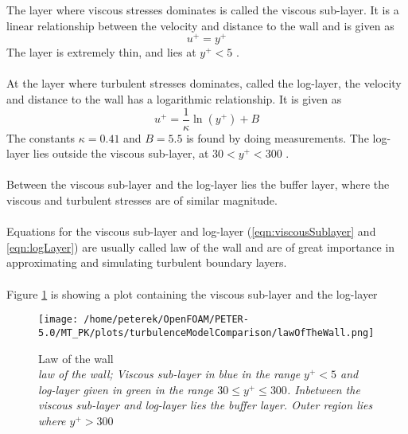 \documentclass[a4paper, 12pt]{report}
\begin{document}
The layer where viscous stresses dominates is called the viscous sub-layer. It is a linear relationship between the velocity and distance to the wall and is given as \cite{CFD}
\begin{equation}
u^+ = y^+
\label{eqn:viscousSublayer}
\end{equation}
The layer is extremely thin, and lies at $y^+ < 5$ \cite{CFD}.\\
\\ 
At the layer where turbulent stresses dominates, called the log-layer, the velocity and distance to the wall has a logarithmic relationship. It is given as \cite{CFD}
\begin{equation}
u^+ = \frac{1}{\kappa}\ln(y^+) + B
\label{eqn:logLayer}
\end{equation}
The constants $\kappa = 0.41$  and $B= 5.5$ is found by doing measurements. The log-layer lies outside the viscous sub-layer, at $30 < y^+ < 300$ \cite{CFD}.\\
\\
Between the viscous sub-layer and the log-layer lies the buffer layer, where the viscous and turbulent stresses are of similar magnitude.\\
\\
Equations for the viscous sub-layer and log-layer (\ref{eqn:viscousSublayer} and  \ref{eqn:logLayer}) are usually called law of the wall and are of great importance in approximating and simulating turbulent boundary layers.\\
\\
Figure \ref{fig:lawOfTheWall} is showing a plot containing the viscous sub-layer and the log-layer
\begin{figure}[H]
	\centering
	\texttt{[image: /home/peterek/OpenFOAM/PETER-5.0/MT\_PK/plots/turbulenceModelComparison/lawOfTheWall.png]}
	\caption{Law of the wall\\ \textit{law of the wall; Viscous sub-layer in blue in the range $y^+ < 5$ and log-layer given in green in the range $30 \leq y^+ \leq 300$. Inbetween the viscous sub-layer and log-layer lies the buffer layer. Outer region lies where $y^+ > 300$}}
	\label{fig:lawOfTheWall}
\end{figure}

 
\end{document}
